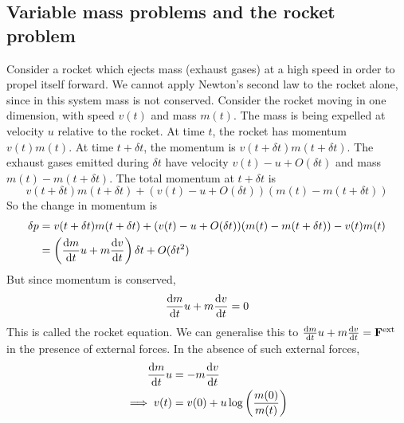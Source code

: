 \subsection{Variable mass problems and the rocket problem}
Consider a rocket which ejects mass (exhaust gases) at a high speed in order to propel itself forward.
We cannot apply Newton's second law to the rocket alone, since in this system mass is not conserved.
Consider the rocket moving in one dimension, with speed \(v(t)\) and mass \(m(t)\).
The mass is being expelled at velocity \(u\) relative to the rocket.
At time \(t\), the rocket has momentum \(v(t) m(t)\).
At time \(t + \delta t\), the momentum is \(v(t + \delta t) m(t + \delta t)\).
The exhaust gases emitted during \(\delta t\) have velocity \(v(t) - u + O(\delta t)\) and mass \(m(t) - m(t + \delta t)\).
The total momentum at \(t + \delta t\) is
\[
	v(t + \delta t) m(t + \delta t) + (v(t) - u + O(\delta t))(m(t) - m(t + \delta t))
\]
So the change in momentum is
\begin{align*}
	\delta p & = v(t + \delta t) m(t + \delta t) + (v(t) - u + O(\delta t))(m(t) - m(t + \delta t)) - v(t) m(t) \\
	         & = \left( \dv{m}{t} u + m \dv{v}{t} \right) \delta t + O(\delta t^2)                              \\
\end{align*}
But since momentum is conserved,
\[
	\dv{m}{t} u + m \dv{v}{t} = 0
\]
This is called the rocket equation.
We can generalise this to \(\dv{m}{t} u + m \dv{v}{t} = \vb F^\text{ext}\) in the presence of external forces.
In the absence of such external forces,
\begin{align*}
	\dv{m}{t} u   & = - m \dv{v}{t}                                  \\
	\implies v(t) & = v(0) + u \log \left( \frac{m(0)}{m(t)} \right)
\end{align*}

